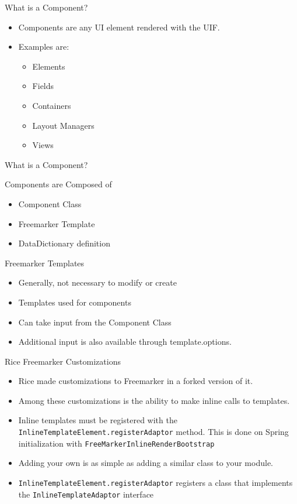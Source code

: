 \documentclass[xcolor=dvipsnames,14pt,professionalfonts]{beamer}
\begin{document}
\begin{frame}{What is a Component?}
  \begin{itemize}
    \item Components are any UI element rendered with the UIF.
    \item Examples are:
      \begin{itemize}
        \item Elements
        \item Fields
        \item Containers
        \item Layout Managers
        \item Views
      \end{itemize}
  \end{itemize}
\end{frame}

\begin{frame}{What is a Component?}
\end{frame}

\begin{frame}{Components are Composed of}
  \begin{itemize}
        \item Component Class
        \item Freemarker Template
        \item DataDictionary definition
  \end{itemize}
\end{frame}

\begin{frame}{Freemarker Templates}
  \begin{itemize}
    \item Generally, not necessary to modify or create
    \item Templates used for components
    \item Can take input from the Component Class
    \item Additional input is also available through template.options.
  \end{itemize}
\end{frame}

\begin{frame}{Rice Freemarker Customizations}
  \begin{itemize}
  \item Rice made customizations to Freemarker in a forked version of
    it.
  \item Among these customizations is the ability to make inline calls
    to templates.
  \item Inline templates must be registered with the
    \texttt{InlineTemplateElement.registerAdaptor}
    method. This is done on Spring initialization with
    \texttt{FreeMarkerInlineRenderBootstrap}
  \item Adding your own is as simple as adding a similar class to your
    module.
  \item \texttt{InlineTemplateElement.registerAdaptor} registers a
    class that implements the \texttt{InlineTemplateAdaptor} interface
  \end{itemize}
\end{frame}
\end{document}
